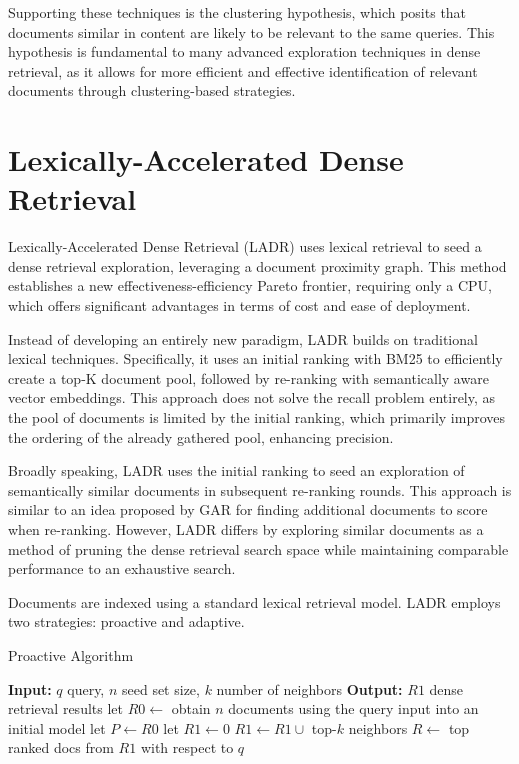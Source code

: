 \documentclass[sigconf,authorversion,nonacm]{acmart}
\begin{document}
Supporting these techniques is the clustering hypothesis\cite{clustering_hypothesis}, which posits that documents similar in
content are likely to be relevant to the same queries. This hypothesis is fundamental to many
advanced exploration techniques in dense retrieval, as it allows for more efficient and effective
identification of relevant documents through clustering-based strategies.
\section{Lexically-Accelerated Dense Retrieval}

Lexically-Accelerated Dense Retrieval (LADR)\cite{ladr} uses lexical retrieval to seed a dense retrieval
exploration, leveraging a document proximity graph. This method establishes a new
effectiveness-efficiency Pareto frontier, requiring only a CPU, which offers significant advantages
in terms of cost and ease of deployment.

Instead of developing an entirely new paradigm, LADR builds on traditional lexical techniques.
Specifically, it uses an initial ranking with BM25 to efficiently create a top-K document pool,
followed by re-ranking with semantically aware vector embeddings. This approach does not solve the
recall problem entirely, as the pool of documents is limited by the initial ranking, which primarily
improves the ordering of the already gathered pool, enhancing precision.

Broadly speaking, LADR uses the initial ranking to seed an exploration of semantically similar
documents in subsequent re-ranking rounds. This approach is similar to an idea proposed by
GAR\cite{gar} for finding additional documents to score when re-ranking. However, LADR differs by
exploring similar documents as a method of pruning the dense retrieval search space while
maintaining comparable performance to an exhaustive search.

Documents are indexed using a standard lexical retrieval model. LADR employs two strategies:
proactive and adaptive.

\begin{algorithm}
	\caption{Proactive Algorithm}
	\begin{algorithmic}[1]
		\STATE \textbf{Input:} \( q \) query, \( n \) seed set size, \( k \) number of neighbors
		\STATE \textbf{Output:} \( R1 \) dense retrieval results
		\STATE let \( R0 \leftarrow \) obtain \( n \) documents using the query input into an initial model
		\STATE let \( P \leftarrow R0 \)
		\STATE let \( R1 \leftarrow 0 \)
		\STATE \( R1 \leftarrow R1 \cup \) top-\( k \) neighbors
		\STATE \( R \leftarrow \) top ranked docs from \( R1 \) with respect to \( q \)
	\end{algorithmic}
\end{algorithm}
\end{document}
